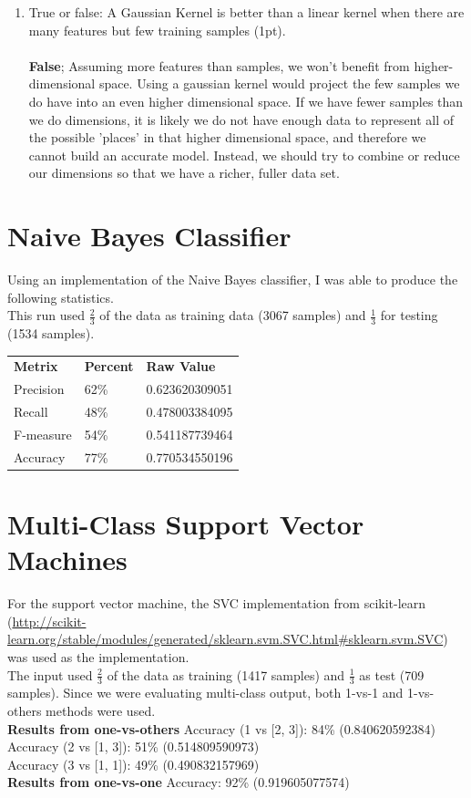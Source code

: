 \documentclass[12pt]{article}
\begin{document}
\begin{enumerate}
\item True or false:  A Gaussian Kernel is better than a linear kernel when there are many features but few training samples (1pt).
\\
\\
\textbf{False}; Assuming more features than samples, we won't benefit from higher-dimensional space. Using a gaussian kernel would project the few samples we do have into an even higher dimensional space. If we have fewer samples than we do dimensions, it is likely we do not have enough data to represent all of the possible 'places' in that higher dimensional space, and therefore we cannot build an accurate model. Instead, we should try to combine or reduce our dimensions so that we have a richer, fuller data set.
\end{enumerate}

\newpage
\section{Naive Bayes Classifier}\label{naive}
Using an implementation of the Naive Bayes classifier, I was able to produce the following statistics.\\
This run used $\frac{2}{3}$ of the data as training data (3067 samples) and $\frac{1}{3}$ for testing (1534 samples). \\

\begin{tabular}{lll}
\textbf{Metrix} & \textbf{Percent} & \textbf{Raw Value} \\
Precision & 62\% & 0.623620309051\\
Recall & 48\% & 0.478003384095 \\
F-measure & 54\% & 0.541187739464\\
Accuracy & 77\% & 0.770534550196
\end{tabular}

\section{Multi-Class Support Vector Machines}\label{svm}
For the support vector machine, the SVC implementation from scikit-learn (\url{http://scikit-learn.org/stable/modules/generated/sklearn.svm.SVC.html#sklearn.svm.SVC}) was used as the implementation. \\
The input used $\frac{2}{3}$ of the data as training (1417 samples) and $\frac{1}{3}$ as test (709 samples). Since we were evaluating multi-class output, both 1-vs-1 and 1-vs-others methods were used.\\
\hfill\linebreak
\textbf{Results from one-vs-others}
Accuracy (1 vs [2, 3]): 84\% (0.840620592384)\\
Accuracy (2 vs [1, 3]): 51\% (0.514809590973)\\
Accuracy (3 vs [1, 1]): 49\% (0.490832157969)\\
\hfill\linebreak
\textbf{Results from one-vs-one}
Accuracy: 92\% (0.919605077574)
\end{document}
